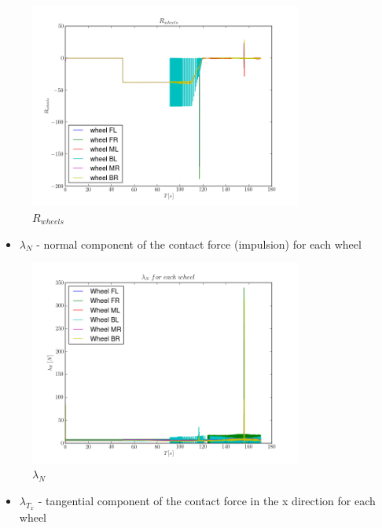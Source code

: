 \begin{figure}[H]
  \centering
    \includegraphics[width=0.8\textwidth]{pWHEELS8}
  \caption{$R_{wheels}$}
\end{figure}

\begin{itemize}
  \item $\lambda_{N}$ - normal component of the contact force (impulsion) for each wheel
\end{itemize}

\begin{figure}[H]
  \centering
    \includegraphics[width=0.8\textwidth]{lambdaN8}
  \caption{$\lambda_N$}
\end{figure}

\begin{itemize}
  \item $\lambda_{T_x}$ - tangential component of the contact force in the x direction for each wheel
\end{itemize}

